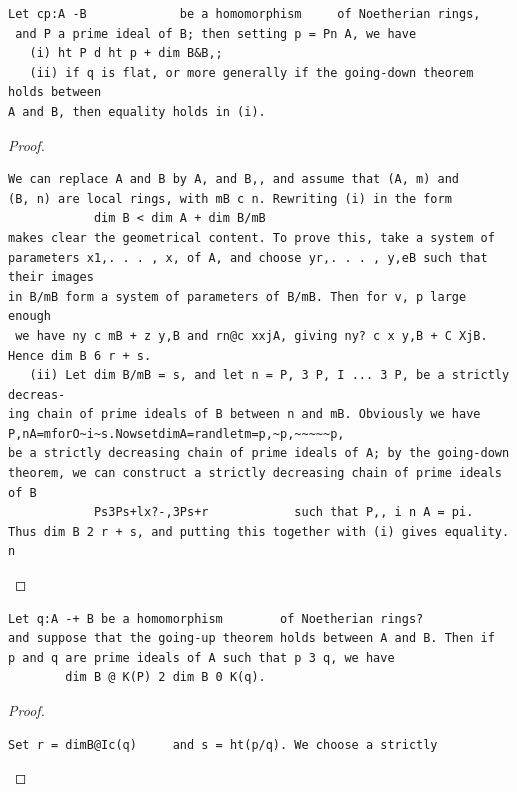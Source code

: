 \begin{theorem}\label{mcrt-auto-theorem-15-1}\uses{}
\begin{verbatim}
Let cp:A -B             be a homomorphism     of Noetherian rings,
 and P a prime ideal of B; then setting p = Pn A, we have
   (i) ht P d ht p + dim B&B,;
   (ii) if q is flat, or more generally if the going-down theorem holds between
A and B, then equality holds in (i).
\end{verbatim}
\end{theorem}
\begin{proof}
\begin{verbatim}
We can replace A and B by A, and B,, and assume that (A, m) and
(B, n) are local rings, with mB c n. Rewriting (i) in the form
            dim B < dim A + dim B/mB
makes clear the geometrical content. To prove this, take a system of
parameters x1,. . . , x, of A, and choose yr,. . . , y,eB such that their images
in B/mB form a system of parameters of B/mB. Then for v, p large enough
 we have ny c mB + z y,B and rn@c xxjA, giving ny? c x y,B + C XjB.
Hence dim B 6 r + s.
   (ii) Let dim B/mB = s, and let n = P, 3 P, I ... 3 P, be a strictly decreas-
ing chain of prime ideals of B between n and mB. Obviously we have
P,nA=mforO~i~s.NowsetdimA=randletm=p,~p,~~~~~p,
be a strictly decreasing chain of prime ideals of A; by the going-down
theorem, we can construct a strictly decreasing chain of prime ideals of B
            Ps3Ps+lx?-,3Ps+r            such that P,, i n A = pi.
Thus dim B 2 r + s, and putting this together with (i) gives equality.         n
\end{verbatim}
\end{proof}


\begin{theorem}\label{mcrt-auto-theorem-15-2}\uses{}
\begin{verbatim}
Let q:A -+ B be a homomorphism        of Noetherian rings?
and suppose that the going-up theorem holds between A and B. Then if
p and q are prime ideals of A such that p 3 q, we have
        dim B @ K(P) 2 dim B 0 K(q).
\end{verbatim}
\end{theorem}
\begin{proof}
\begin{verbatim}
Set r = dimB@Ic(q)     and s = ht(p/q). We choose a strictly
\end{verbatim}
\end{proof}


